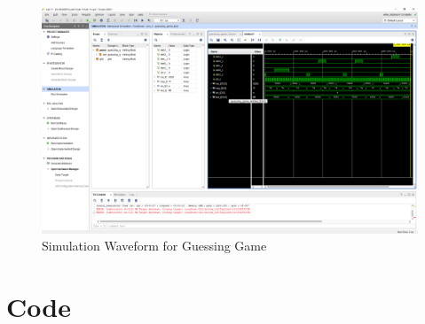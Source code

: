 \documentclass[11pt]{article}
\newcommand{\Verilog}[2][]{%
	
}
\begin{document}
\begin{figure}[ht]\centering
	\caption{Simulation Waveform for Guessing Game}
	\includegraphics [width=1\textwidth,trim=640 550 10 135, clip]{guessing_game_sim}
\end{figure}


\section*{Code}

\Verilog{Lab11/systemverilog/guess_FSM.sv}

\Verilog{Lab11/systemverilog/guess_FSM_test.sv}

\Verilog{Lab11/systemverilog/guessing_game.sv}

\Verilog{Lab11/systemverilog/guessing_game_test.sv}
\end{document}
